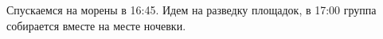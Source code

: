 Спускаемся на морены в 16:45. Идем на разведку площадок, в 17:00 группа собирается вместе на месте ночевки.















    \FloatBarrier
